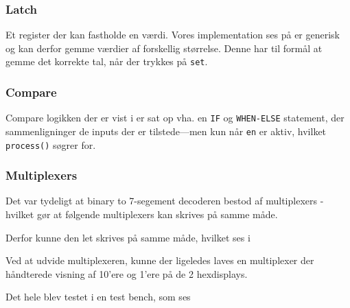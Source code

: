{    

    \subsubsection*{Latch}
    Et register der kan fastholde en værdi. Vores implementation ses på  er generisk og kan derfor gemme værdier af forskellig størrelse. Denne har til formål at gemme det korrekte tal, når der trykkes på \texttt{set}.


    \subsubsection*{Compare}
    Compare logikken der er vist i  er sat op vha. en \texttt{IF} og \texttt{WHEN-ELSE} statement, der sammenligninger de inputs der er tilstede---men kun når \texttt{en} er aktiv, hvilket \texttt{process()} søgrer for.


    \subsubsection*{Multiplexers}
    Det var tydeligt at binary to 7-segement decoderen bestod af multiplexers - hvilket gør at følgende multiplexers kan skrives på samme måde.

    Derfor kunne den let skrives på samme måde, hvilket ses i 

    Ved at udvide multiplexeren, kunne der ligeledes laves en multiplexer der håndterede visning af 10'ere og 1'ere på de 2 hexdisplays.

    Det hele blev testet i en test bench, som ses

}
